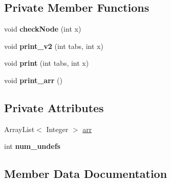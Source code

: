 \subsection*{Private Member Functions}
\begin{DoxyCompactItemize}
\item 
\mbox{\label{classdomini_1_1utils_1_1BinTree_ae9ac7c25f515a2f89772406f01b769d2}} 
void {\bfseries check\+Node} (int x)
\item 
\mbox{\label{classdomini_1_1utils_1_1BinTree_ae65e589ea90a85ed18bba6bc9f74e9a2}} 
void {\bfseries print\+\_\+v2} (int tabs, int x)
\item 
\mbox{\label{classdomini_1_1utils_1_1BinTree_a47c913594a3116b2e602c87fa4afc5c3}} 
void {\bfseries print} (int tabs, int x)
\item 
\mbox{\label{classdomini_1_1utils_1_1BinTree_aec1bd291bf3703915a815d09cfb0caf1}} 
void {\bfseries print\+\_\+arr} ()
\end{DoxyCompactItemize}
\subsection*{Private Attributes}
\begin{DoxyCompactItemize}
\item 
Array\+List$<$ Integer $>$ \hyperlink{classdomini_1_1utils_1_1BinTree_a357bcbcf07ba7fcb99d11b237d189e65}{arr}
\item 
\mbox{\label{classdomini_1_1utils_1_1BinTree_a36f1212262c353accbc0a0385fa45a8d}} 
int {\bfseries num\+\_\+undefs}
\end{DoxyCompactItemize}


\subsection{Member Data Documentation}
\mbox{\label{classdomini_1_1utils_1_1BinTree_a357bcbcf07ba7fcb99d11b237d189e65}} 

